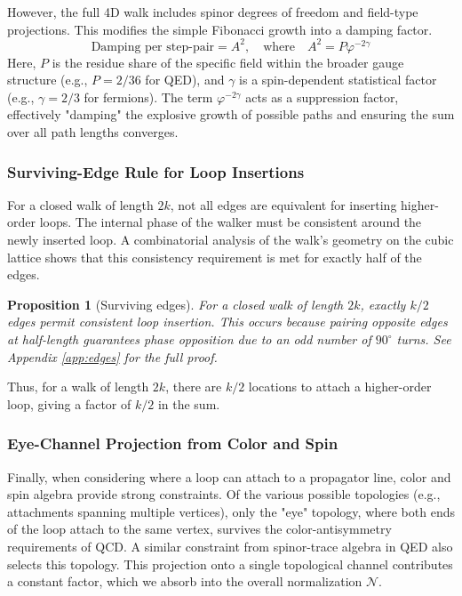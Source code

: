 \documentclass[11pt,a4paper]{article}
\newtheorem{proposition}[theorem]{Proposition}
\theoremstyle{definition}
\theoremstyle{remark}
\begin{document}
However, the full 4D walk includes spinor degrees of freedom and field-type projections. This modifies the simple Fibonacci growth into a damping factor.
\begin{equation}
\label{eq:damping}
\text{Damping per step-pair} = A^{2}, \quad \text{where} \quad A^2 = P\varphi^{-2\gamma}
\end{equation}
Here, $P$ is the residue share of the specific field within the broader gauge structure (e.g., $P=2/36$ for QED), and $\gamma$ is a spin-dependent statistical factor (e.g., $\gamma=2/3$ for fermions). The term $\varphi^{-2\gamma}$ acts as a suppression factor, effectively "damping" the explosive growth of possible paths and ensuring the sum over all path lengths converges.

\subsubsection{Surviving-Edge Rule for Loop Insertions}

For a closed walk of length $2k$, not all edges are equivalent for inserting higher-order loops. The internal phase of the walker must be consistent around the newly inserted loop. A combinatorial analysis of the walk's geometry on the cubic lattice shows that this consistency requirement is met for exactly half of the edges.
\begin{proposition}[Surviving edges]
\label{prop:surviving}
For a closed walk of length $2k$, exactly $k/2$ edges permit consistent loop insertion. This occurs because pairing opposite edges at half-length guarantees phase opposition due to an odd number of $90^\circ$ turns. See Appendix \ref{app:edges} for the full proof.
\end{proposition}
Thus, for a walk of length $2k$, there are $k/2$ locations to attach a higher-order loop, giving a factor of $k/2$ in the sum.

\subsubsection{Eye-Channel Projection from Color and Spin}

Finally, when considering where a loop can attach to a propagator line, color and spin algebra provide strong constraints. Of the various possible topologies (e.g., attachments spanning multiple vertices), only the "eye" topology, where both ends of the loop attach to the same vertex, survives the color-antisymmetry requirements of QCD. A similar constraint from spinor-trace algebra in QED also selects this topology. This projection onto a single topological channel contributes a constant factor, which we absorb into the overall normalization $\mathcal{N}$.
\end{document}
